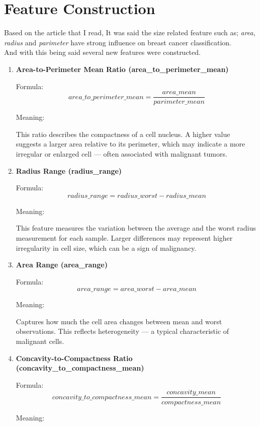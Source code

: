 \documentclass{article}
\begin{document}
\section{Feature Construction}
Based on the article that I read, It was said the size related feature such as; \emph{area}, \emph{radius} and \emph{parimeter}
have strong influence on breast cancer classification.\\
And with this being said several new features were constructed.

\begin{enumerate}

    \item \textbf{Area-to-Perimeter Mean Ratio (area\_to\_perimeter\_mean)}

    Formula: $$area\_to\_perimeter\_mean = \frac{area\_mean}{parimeter\_mean}$$

    Meaning:

    This ratio describes the compactness of a cell nucleus.
    A higher value suggests a larger area relative to its perimeter,
    which may indicate a more irregular or enlarged cell — often associated with malignant tumors.

    \item \textbf{Radius Range (radius\_range)}

    Formula: $$radius\_range = radius\_worst - radius\_mean$$

    Meaning:
    
    This feature measures the variation between the average and the worst radius measurement for each sample.
    Larger differences may represent higher irregularity in cell size, which can be a sign of malignancy.

    \item \textbf{Area Range (area\_range)}

    Formula: $$area\_range = area\_worst - area\_mean$$

    Meaning:
    
    Captures how much the cell area changes between mean and worst observations.
    This reflects heterogeneity — a typical characteristic of malignant cells.

    \item \textbf{Concavity-to-Compactness Ratio (concavity\_to\_compactness\_mean)}

    Formula: $$concavity\_to\_compactness\_mean = \frac{concavity\_mean}{compactness\_mean}$$

    Meaning:
    

\end{enumerate}
\end{document}
